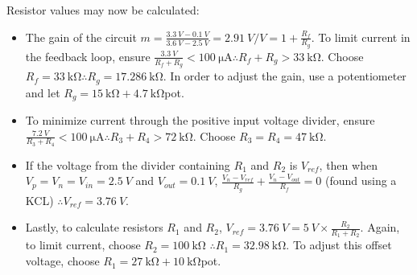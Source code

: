 Resistor values may now be calculated:
\begin{itemize}
    \item The gain of the circuit $m = \frac{\SI{3.3}{V} - \SI{0.1}{V}}{\SI{3.6}{V} - \SI{2.5}{V}} = \SI{2.91}{V/V} = 1 + \frac{R_f}{R_g}$.
          To limit current in the feedback loop, ensure $\frac{\SI{3.3}{V}}{R_f + R_g} < \SI{100}{\micro\ampere} \therefore R_f + R_g > \SI{33}{\kilo\ohm}$.
          Choose $R_f = \SI{33}{\kilo\ohm} \therefore R_g = \SI{17.286}{\kilo\ohm}$. In order to adjust the gain, use a potentiometer and let $R_g = \SI{15}{\kilo\ohm} + \SI{4.7}{\kilo\ohm}$pot.
    \item To minimize current through the positive input voltage divider, ensure $\frac{\SI{7.2}{V}}{R_3 + R_4} < \SI{100}{\micro\ampere} \therefore R_3 + R_4 > \SI{72}{\kilo\ohm}$.
          Choose $R_3 = R_4 = \SI{47}{\kilo\ohm}$.
    \item If the voltage from the divider containing $R_1$ and $R_2$ is $V_{ref}$, then when $V_p = V_n = V_{in} = \SI{2.5}{V}$ and $V_{out} = \SI{0.1}{V}$,
          $\frac{V_n - V_{ref}}{R_g} + \frac{V_n - V_{out}}{R_f} = 0$ (found using a KCL) $\therefore V_{ref} = \SI{3.76}{V}$.
    \item Lastly, to calculate resistors $R_1$ and $R_2$, $V_{ref} = \SI{3.76}{V} = \SI{5}{V} \times \frac{R_2}{R_1 + R_2}$. Again, to limit current, choose $R_2 = \SI{100}{\kilo\ohm}$
          $\therefore R_1 = \SI{32.98}{\kilo\ohm}$. To adjust this offset voltage, choose $R_1 = \SI{27}{\kilo\ohm} + \SI{10  }{\kilo\ohm}$pot.
\end{itemize}
